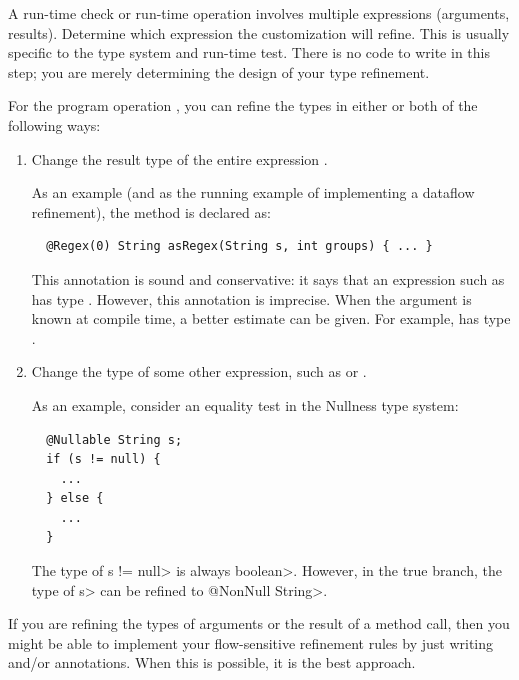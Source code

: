 
A run-time check or run-time
operation involves multiple expressions (arguments, results).
Determine which expression the customization will refine.  This is
usually specific to the type system and run-time test.
There is no code to write in this step; you are merely determining
the design of your type refinement.

For the program operation , you can refine
the types in either or both of the following ways:
\begin{enumerate}
\item Change the result type of the entire expression .

As an example (and as the running example of implementing a dataflow
refinement), the  method is declared as:

\begin{smaller}
\begin{Verbatim}
  @Regex(0) String asRegex(String s, int groups) { ... }
\end{Verbatim}
\end{smaller}

\noindent
This annotation is sound and conservative:  it says that an expression such
as  has type .  However, this annotation is imprecise.  When the 
argument is known at compile time, a better estimate can be given.  For
example,  has type .

\item Change the type of some other expression, such as  or .

As an example, consider an equality test in the Nullness type system:

\begin{Verbatim}
  @Nullable String s;
  if (s != null) {
    ...
  } else {
    ...
  }
\end{Verbatim}

The type of \<s != null> is always \<boolean>.  However, in the
true branch, the type of \<s> can be refined to \<@NonNull String>.

\end{enumerate}

If you are refining the types of arguments or the result of a method call,
then you might be able to implement your flow-sensitive refinement rules by
just writing  and/or
 annotations.
When this is possible, it is the best approach.

